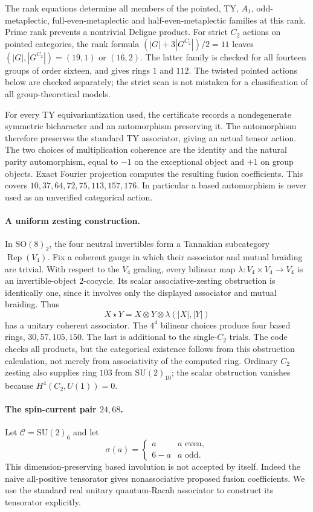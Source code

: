\documentclass[11pt,a4paper]{article}
\begin{document}
The rank equations determine all members of the pointed, TY, $A_1$,
odd-metaplectic, full-even-metaplectic and half-even-metaplectic families
at this rank.  Prime rank prevents a nontrivial Deligne product.
For strict $C_2$ actions on pointed categories, the rank formula
$(|G|+3|G^{C_2}|)/2=11$ leaves $(|G|,|G^{C_2}|)=(19,1)$ or $(16,2)$.
The latter family is checked for all fourteen groups of order sixteen,
and gives rings $1$ and $112$.  The twisted pointed actions below are
checked separately; the strict scan is not mistaken for a classification
of all group-theoretical models.

For every TY equivariantization used, the certificate records a
nondegenerate symmetric bicharacter and an automorphism preserving it.
The automorphism therefore preserves the standard TY associator, giving
an actual tensor action.  The two choices of multiplication coherence
are the identity and the natural parity automorphism, equal to $-1$ on
the exceptional object and $+1$ on group objects.  Exact Fourier
projection computes the resulting fusion coefficients.  This covers
$10,37,64,72,75,113,157,176$.  In particular a based automorphism is
never used as an unverified categorical action.

\paragraph{A uniform zesting construction.}
In $\mathrm{SO}(8)_2$, the four neutral invertibles form a Tannakian
subcategory $\operatorname{Rep}(V_4)$.  Fix a coherent gauge in which
their associator and mutual braiding are trivial.  With respect to the
$V_4$ grading, every bilinear map
$\lambda:V_4\times V_4\longrightarrow V_4$ is an invertible-object
$2$-cocycle.  Its scalar associative-zesting obstruction is identically
one, since it involves only the displayed associator and mutual
braiding.  Thus
\[
 X\star Y=X\otimes Y\otimes\lambda(|X|,|Y|)
\]
has a unitary coherent associator.  The $4^4$ bilinear choices produce
four based rings, $30,57,105,150$.  The last is additional to the
single-$C_2$ trials.  The code checks all products, but the categorical
existence follows from this obstruction calculation, not merely from
associativity of the computed ring.  Ordinary $C_2$ zesting also supplies
ring $103$ from $\mathrm{SU}(2)_{10}$; the scalar obstruction vanishes
because $H^4(C_2,U(1))=0$.

\paragraph{The spin-current pair $24,68$.}
Let $\mathcal C=\mathrm{SU}(2)_6$ and let
\[
 \sigma(a)=\begin{cases}a&a\text{ even},\\6-a&a\text{ odd}.
 \end{cases}
\]
This dimension-preserving based involution is not accepted by itself.
Indeed the naive all-positive tensorator gives nonassociative proposed
fusion coefficients.  We use the standard real unitary quantum-Racah
associator to construct its tensorator explicitly.
\end{document}
